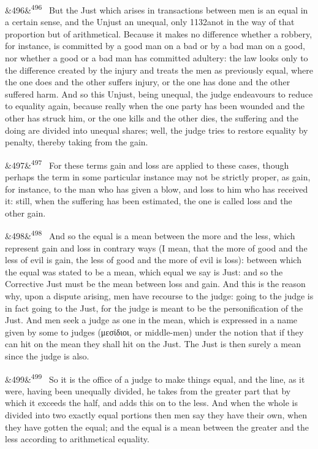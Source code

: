 \documentclass[12pt]{article}
\newcommand{\para}[1][]{\par\noindent\ifx&#1&\else\textsuperscript{\footnotesize #1}~\fi}
\begin{document}
\para[496] But the Just which arises in transactions between men is an equal in a certain sense, and the Unjust an unequal, only 1132anot in the way of that proportion but of arithmetical. Because it makes no difference whether a robbery, for instance, is committed by a good man on a bad or by a bad man on a good, nor whether a good or a bad man has committed adultery: the law looks only to the difference created by the injury and treats the men as previously equal, where the one does and the other suffers injury, or the one has done and the other suffered harm. And so this Unjust, being unequal, the judge endeavours to reduce to equality again, because really when the one party has been wounded and the other has struck him, or the one kills and the other dies, the suffering and the doing are divided into unequal shares; well, the judge tries to restore equality by penalty, thereby taking from the gain.

\para[497] For these terms gain and loss are applied to these cases, though perhaps the term in some particular instance may not be strictly proper, as gain, for instance, to the man who has given a blow, and loss to him who has received it: still, when the suffering has been estimated, the one is called loss and the other gain.

\para[498] And so the equal is a mean between the more and the less, which represent gain and loss in contrary ways (I mean, that the more of good and the less of evil is gain, the less of good and the more of evil is loss): between which the equal was stated to be a mean, which equal we say is Just: and so the Corrective Just must be the mean between loss and gain. And this is the reason why, upon a dispute arising, men have recourse to the judge: going to the judge is in fact going to the Just, for the judge is meant to be the personification of the Just. And men seek a judge as one in the mean, which is expressed in a name given by some to judges (μεσίδιοι, or middle-men) under the notion that if they can hit on the mean they shall hit on the Just. The Just is then surely a mean since the judge is also.

\para[499] So it is the office of a judge to make things equal, and the line, as it were, having been unequally divided, he takes from the greater part that by which it exceeds the half, and adds this on to the less. And when the whole is divided into two exactly equal portions then men say they have their own, when they have gotten the equal; and the equal is a mean between the greater and the less according to arithmetical equality.
\end{document}
